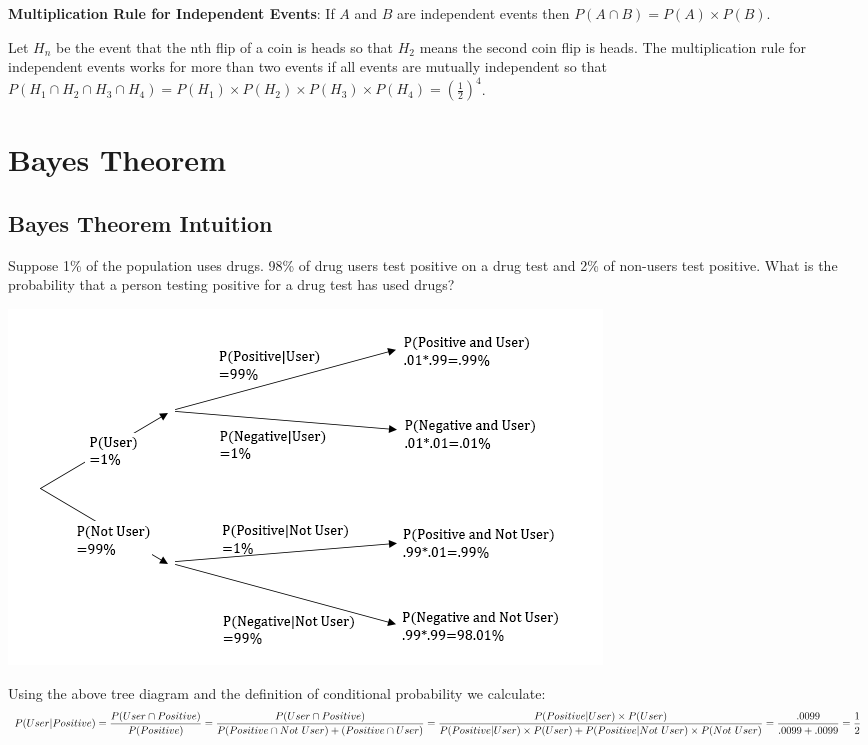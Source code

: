 \documentclass[
]{book}
\begin{document}
\textbf{Multiplication Rule for Independent Events}: If \(A\) and \(B\) are independent events then \(P(A \cap B) = P(A) \times P(B)\).

Let \(H_n\) be the event that the nth flip of a coin is heads so that \(H_2\) means the second coin flip is heads. The multiplication rule for independent events works for more than two events if all events are mutually independent so that \(P(H_1 \cap H_2 \cap H_3 \cap H_4)=P(H_1)\times P(H_2)\times P(H_3)\times P(H_4) = (\frac{1}{2})^4\).

\hypertarget{bayes-theorem}{%
\section{Bayes Theorem}\label{bayes-theorem}}

\hypertarget{bayes-theorem-intuition}{%
\subsection{Bayes Theorem Intuition}\label{bayes-theorem-intuition}}

Suppose 1\% of the population uses drugs. 98\% of drug users test positive on a drug test and 2\% of non-users test positive. What is the probability that a person testing positive for a drug test has used drugs?

\includegraphics{Pictures/03-Probability/BayesTreeSmall.PNG}

Using the above tree diagram and the definition of conditional probability we calculate: \[P(User|Positive) = \frac{P(User \cap Positive)}{P(Positive)}= \\ 
\frac{P(User \cap Positive)}{P(Positive \cap Not \ User) + (Positive \cap User)} =\\  \frac{P(Positive|User) \times P(User)}{P(Positive|User) \times P(User)+P(Positive|Not \ User) \times P(Not \ User)} = \\
\frac{.0099}{.0099+.0099}=\frac{1}{2}\]
\end{document}
